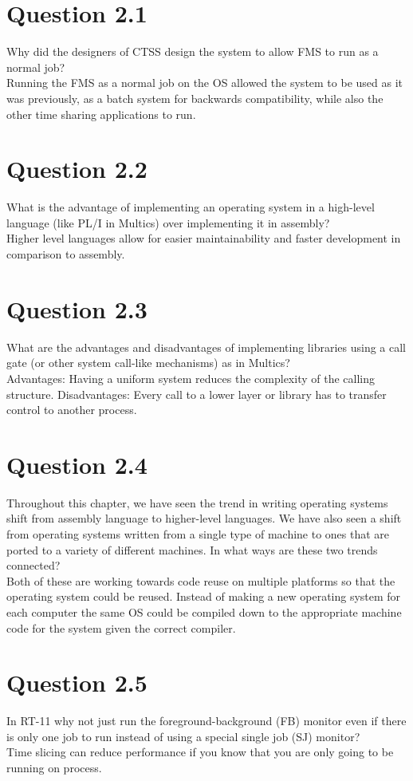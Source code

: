 \documentclass{article}
\begin{document}
\section*{Question 2.1}
Why did the designers of CTSS design the system to allow FMS to run as a normal job?
\\
Running the FMS as a normal job on the OS allowed the system to be used as it was previously, as a batch system for backwards compatibility, while also the other time sharing applications to run.

\section*{Question 2.2}
What is the advantage of implementing an operating system in a high-level language (like PL/I in Multics) over implementing it in assembly?
\\
Higher level languages allow for easier maintainability and faster development in comparison to assembly.

\section*{Question 2.3}
What are the advantages and disadvantages of implementing libraries using a call gate (or other system call-like mechanisms) as in Multics?
\\
Advantages: Having a uniform system reduces the complexity of the calling structure.
Disadvantages: Every call to a lower layer or library has to transfer control to another process.

\section*{Question 2.4}
Throughout this chapter, we have seen the trend in writing operating systems shift from assembly language to higher-level languages.
We have also seen a shift from operating systems written from a single type of machine to ones that are ported to a variety of different machines. In what ways are these two trends connected?
\\
Both of these are working towards code reuse on multiple platforms so that the operating system could be reused.
Instead of making a new operating system for each computer the same OS could be compiled down to the appropriate machine code for the system given the correct compiler.

\section*{Question 2.5}
In RT-11 why not just run the foreground-background (FB) monitor even if there is only one job to run instead of using a special single job (SJ) monitor?
\\
Time slicing can reduce performance if you know that you are only going to be running on process.
\end{document}
